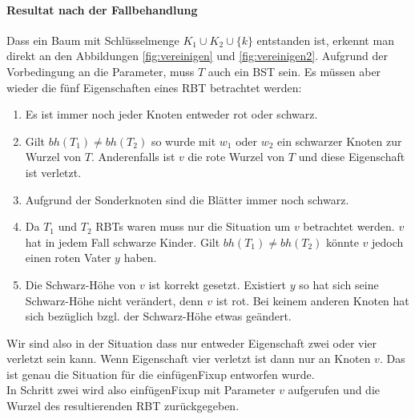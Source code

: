 \documentclass[a4paper,12pt]{article}
\begin{document}
\paragraph{Resultat nach der Fallbehandlung}
Dass ein Baum mit Schlüsselmenge  $K_1 \cup K_2 \cup \{k\} $ entstanden ist, erkennt man direkt an den Abbildungen \ref{fig:vereinigen} und \ref{fig:vereinigen2}. Aufgrund der Vorbedingung an die Parameter, muss $T$ auch ein BST sein. Es müssen aber wieder die fünf Eigenschaften eines RBT betrachtet werden:
\begin{enumerate}
	\item Es ist immer noch jeder Knoten entweder rot oder schwarz.
	\item Gilt $bh(T_1) \neq bh(T_2)$ so wurde mit $w_1$ oder $w_2$ ein schwarzer Knoten zur Wurzel von $T$. Anderenfalls ist $v$ die rote Wurzel von $T$ und diese Eigenschaft ist verletzt.   
	\item Aufgrund der Sonderknoten sind die Blätter immer noch schwarz.
	\item Da $T_1$ und $T_2$ RBTs waren muss nur die Situation um $v$ betrachtet werden. $v$ hat in jedem Fall schwarze Kinder. Gilt $bh(T_1) \neq bh(T_2)$ könnte $v$ jedoch einen roten Vater $y$ haben. 
	\item Die Schwarz-Höhe von $v$ ist korrekt gesetzt. Existiert $y$ so hat sich seine Schwarz-Höhe nicht verändert, denn $v$ ist rot. Bei keinem anderen Knoten hat sich bezüglich bzgl. der Schwarz-Höhe etwas geändert. 
\end{enumerate} 
Wir sind also in der Situation dass nur entweder Eigenschaft zwei oder vier verletzt sein kann. Wenn Eigenschaft vier verletzt ist dann nur an Knoten $v$. Das ist genau die Situation für die einfügenFixup entworfen wurde.\\
In Schritt zwei wird also einfügenFixup mit Parameter $v$ aufgerufen und die Wurzel des resultierenden RBT zurückgegeben. 
\end{document}
